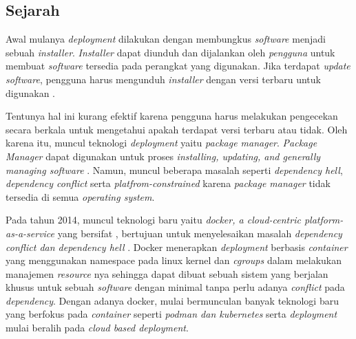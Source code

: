 \subsection{Sejarah}

Awal mulanya \textit{deployment} dilakukan dengan membungkus \textit{software} menjadi sebuah \textit{installer}. \textit{Installer} dapat diunduh dan dijalankan oleh \textit{pengguna} untuk membuat \textit{software} tersedia pada perangkat yang digunakan. Jika terdapat \textit{update software}, pengguna harus mengunduh \textit{installer} dengan versi terbaru untuk digunakan \parencite{softwareDeploymentCarzaniga1998characterization}.

Tentunya hal ini kurang efektif karena pengguna harus melakukan pengecekan secara berkala untuk mengetahui apakah terdapat versi terbaru atau tidak. Oleh karena itu, muncul teknologi \textit{deployment} yaitu \textit{package manager}. \textit{Package Manager} dapat digunakan untuk proses \textit{installing, updating, and generally managing software} \parencite{softwareDeploymentCarzaniga1998characterization}. Namun, muncul beberapa masalah seperti \textit{dependency hell}, \textit{dependency conflict} serta \textit{platfrom-constrained} karena \textit{package manager} tidak tersedia di semua \textit{operating system}.

Pada tahun 2014, muncul teknologi baru yaitu \textit{docker, a cloud-centric platform-as-a-service} yang bersifat \textit{}, bertujuan untuk menyelesaikan masalah \textit{dependency conflict dan dependency hell} \parencite{merkel2014docker}. Docker menerapkan \textit{deployment} berbasis \textit{container} yang menggunakan namespace pada linux kernel dan \textit{cgroups} dalam melakukan manajemen \textit{resource} nya sehingga dapat dibuat sebuah sistem yang berjalan khusus untuk sebuah \textit{software} dengan minimal tanpa perlu adanya \textit{conflict} pada \textit{dependency}. Dengan adanya docker, mulai bermunculan banyak teknologi baru yang berfokus pada \textit{container} seperti \textit{podman dan kubernetes} serta \textit{deployment} mulai beralih pada \textit{cloud based deployment}.